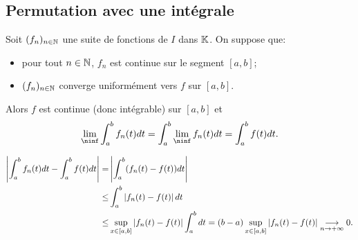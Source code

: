 \documentclass{book}
\newcommand{\fn}{(f_n)_{n\in \N   }}
\begin{document}
\subsection{Permutation avec une intégrale}\label{sec:perm-int}

\begin{Theoreme}
Soit $\fn$ une suite de fonctions de $I$ dans $\mathbb{K}  $.
On suppose que:
\begin{itemize}
\item
  pour tout $n\in \mathbb{N}   $, $f_n$ est continue sur le segment $[a,b]$;
\item
  $\fn$ converge uniformément vers $f$ sur $[a,b]$.
\end{itemize}
Alors $f$ est continue (donc intégrable) sur $[a,b]$ et
\[  \lim_\ninf \int_a^b f_n(t)dt = \int_a^b \lim_\ninf f_n(t)dt = \int_a^b f(t)dt. \]
\end{Theoreme}
\begin{Demonstration}
$$\begin{aligned}
\left|\int_a^b f_n(t)dt -\int_a^b f(t)dt\right|=&\left|\int_a^b (f_n(t)-f(t))dt\right|\\
\leq&\int_a^b\left|f_n(t)-f(t)\right|dt\\
\leq &\sup_{x\in[a,b]}\left|f_n(t)-f(t)\right|\int_a^b dt=(b-a) \sup_{x\in[a,b]}\left|f_n(t)-f(t)\right|  \tend[n\to+\infty ]0.
\end{aligned}$$ 
\end{Demonstration}
\end{document}

